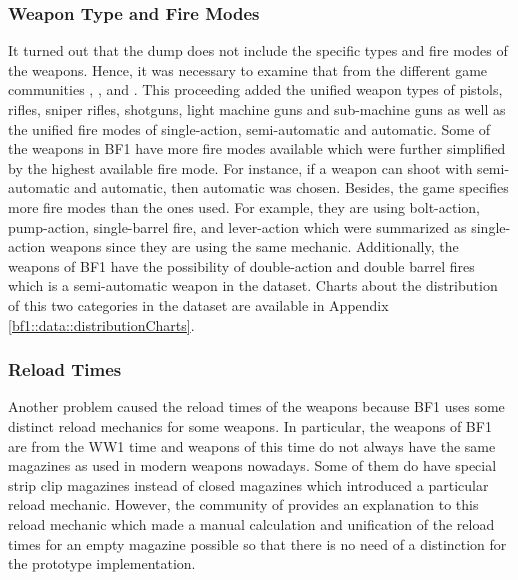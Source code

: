 \documentclass[MGS,Master,english]{twbook}%
\begin{document}
\subsubsection{Weapon Type and Fire Modes}
It turned out that the dump does not include the specific types and fire modes of the weapons. Hence, it was necessary to examine that from the different game communities \citep{symthic::bf1stats}, \citep{bf1::community1}, and \citep{bf1::community2}. This proceeding added the unified weapon types of pistols, rifles, sniper rifles, shotguns, light machine guns and sub-machine guns as well as the unified fire modes of single-action, semi-automatic and automatic. Some of the weapons in \ac{BF1} have more fire modes available which were further simplified by the highest available fire mode. For instance, if a weapon can shoot with semi-automatic and automatic, then automatic was chosen. Besides, the game specifies more fire modes than the ones used. For example, they are using bolt-action, pump-action, single-barrel fire, and lever-action which were summarized as single-action weapons since they are using the same mechanic. Additionally, the weapons of BF1 have the possibility of double-action and double barrel fires which is a semi-automatic weapon in the dataset. Charts about the distribution of this two categories in the dataset are available in Appendix \ref{bf1::data::distributionCharts}. 

\subsubsection{Reload Times}
Another problem caused the reload times of the weapons because \ac{BF1} uses some distinct reload mechanics for some weapons. In particular, the weapons of BF1 are from the WW1 time and weapons of this time do not always have the same magazines as used in modern weapons nowadays. Some of them do have special strip clip magazines instead of closed magazines which introduced  a particular reload mechanic. However, the community of \citep{symthic::bf1stats} provides an explanation to this reload mechanic which made a manual calculation and unification of the reload times for an empty magazine possible so that there is no need of a distinction for the prototype implementation.
\end{document}
